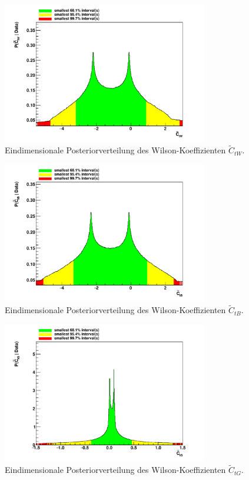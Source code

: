 \begin{figure}
    \centering
    \includegraphics[width=0.8\textwidth]{Plots/ctw.pdf}
    \caption{Eindimensionale Posteriorverteilung des Wilson-Koeffizienten $\tilde{C}_{tW}$.}
    \label{fig:ctw}
\end{figure}
\begin{figure}
    \centering
    \includegraphics[width=0.8\textwidth]{Plots/ctb.pdf}
    \caption{Eindimensionale Posteriorverteilung des Wilson-Koeffizienten $\tilde{C}_{tB}$.}
    \label{fig:ctb}
\end{figure}
\begin{figure}
    \centering
    \includegraphics[width=0.8\textwidth]{Plots/ctg.pdf}
    \caption{Eindimensionale Posteriorverteilung des Wilson-Koeffizienten $\tilde{C}_{tG}$.}
    \label{fig:ctg}
\end{figure}
